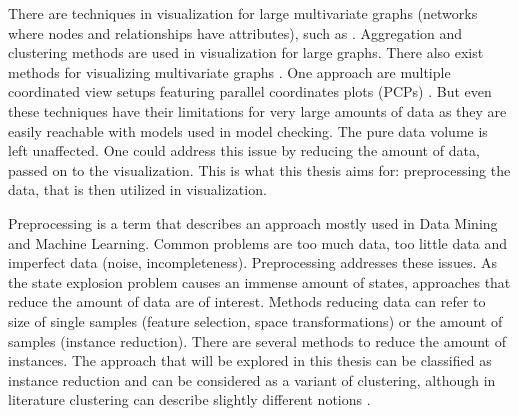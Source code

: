 \documentclass[preview]{standalone}
\begin{document}
There are techniques in visualization for large multivariate graphs (networks where nodes and relationships have attributes), such as \mdpsN. Aggregation and clustering methods are used in visualization for large graphs\cite{Goerke2009}. There also exist methods for visualizing multivariate graphs \cite{Kerren2014,Nobre2019}. One approach are multiple coordinated view setups featuring parallel coordinates plots (PCPs) \cite{Johansson2016}. But even these techniques have their limitations for very large amounts of data as they are easily reachable with models used in model checking. The pure data volume is left unaffected. One could address this issue by reducing the amount of data, passed on to the visualization. This is what this thesis aims for: preprocessing the data, that is then utilized in visualization.

Preprocessing is a term that describes an approach mostly used in Data Mining and Machine Learning. Common problems are too much data, too little data and imperfect data (noise, incompleteness)\cite{Garcia2016}. Preprocessing addresses these issues. As the state explosion problem causes an immense amount of states, approaches that reduce the amount of data are of interest. Methods reducing data can refer to size of single samples (feature selection, space transformations) or the amount of samples (instance reduction). There are several methods to reduce the amount of instances. The approach that will be explored in this thesis can be classified as instance reduction and can be considered as a variant of clustering, although in literature clustering can describe slightly different notions \cite{Alasadi2017,Baskar2013}.
\end{document}
